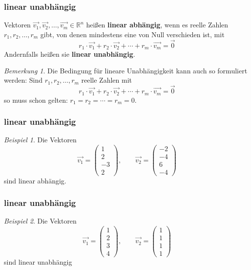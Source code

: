 \documentclass[hyperref={pdfpagelabels=false}]{beamer}
\theoremstyle{plain}%
\theoremstyle{definition}
\theoremstyle{remark}
\newtheorem*{beispiel}{Beispiel}
\newtheorem*{notiz}{Bemerkung}
\def \R{\mathbb R}
\newcommand{\vektor}[1]{\overrightarrow{#1}}
\begin{document}
\begin{frame}
\frametitle{linear unabhängig}

\begin{definition}\label{uvr_lin_unab} 
Vektoren  $\vektor{v_1}, \vektor{v_2}, \ldots, \vektor{v_m} \in \R^n$ 
heißen \textbf{linear abhängig}, wenn es reelle Zahlen $r_1, r_2, \ldots, r_m$ gibt, 
von denen mindestens eine von Null verschieden ist, mit
  	$$ r_1 \cdot \vektor{v_1} + r_2 \cdot  \vektor{v_2} + \cdots + r_m 
     	\cdot \vektor{v_m} = \vektor{0} $$ \pause 
Andernfalls heißen sie \textbf{linear unabhängig}.
\end{definition}

\pause 
\begin{notiz} Die Bedingung für lineare Unabhängigkeit kann auch so formuliert werden: \pause Sind $r_1,  r_2, 
\ldots, r_m$ reelle Zahlen mit 
  	$$ r_1 \cdot \vektor{v_1} + r_2 \cdot  \vektor{v_2} + \cdots + r_m \cdot \vektor{v_m} = \vektor{0} $$
so muss schon gelten: $r_1 = r_2 = \cdots = r_m = 0$.
\end{notiz}

\end{frame}

\begin{frame}
\frametitle{linear unabhängig}

\begin{beispiel} 
Die Vektoren 
	$$ \vektor{v_1} = \left( \begin{matrix} 1 \\ 2 \\ -3 \\ 2 \end{matrix} \right), \qquad 
	\vektor{v_2} = \left( \begin{matrix} -2 \\ -4 \\ 6 \\ -4 \end{matrix} \right) $$ 
sind linear abhängig.
\end{beispiel}

\end{frame}

\begin{frame}
\frametitle{linear unabhängig}

\begin{beispiel} 
Die Vektoren 
	$$ \vektor{v_1} = \left( \begin{matrix} 1 \\ 2 \\ 3 \\ 4 \end{matrix} \right), \qquad 
	\vektor{v_2} = \left( \begin{matrix} 1 \\ 1 \\ 1 \\ 1 \end{matrix} \right) $$ 
sind linear unabhängig
\end{beispiel}

\end{frame}
\end{document}
